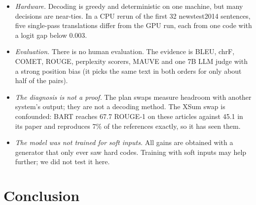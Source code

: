 \documentclass[11pt]{article}
\begin{document}
\begin{itemize}[leftmargin=*, topsep=4pt, itemsep=3pt, parsep=0pt]
  include the selection articles. On WMT14, newstest2014 was not untouched when $T_s$ was chosen on newstest2013: the
  first run had tried four temperatures on it. On Sudoku, the selection and held-out boards are halves of the same
  2,000.
\item \emph{Hardware.} Decoding is greedy and deterministic on one machine, but many decisions are near-ties. In a
  CPU rerun of the first 32 newstest2014 sentences, five single-pass translations differ from the GPU run, each
  from one code with a logit gap below 0.003.
\item \emph{Evaluation.} There is no human evaluation. The evidence is BLEU, chrF, COMET, ROUGE, perplexity
  scorers, MAUVE and one 7B LLM judge with a strong position bias (it picks the same text in both orders for only about half
  of the pairs).
\item \emph{The diagnosis is not a proof.} The plan swaps measure headroom with another system's output; they are
  not a decoding method. The XSum swap is confounded: BART reaches 67.7 ROUGE-1 on these articles against 45.1 in
  its paper and reproduces 7\% of the references exactly, so it has seen them.
\item \emph{The model was not trained for soft inputs.} All gains are obtained with a generator that only ever saw
  hard codes. Training with soft inputs may help further; we did not test it here.
\end{itemize}

\section{Conclusion}
\end{document}
